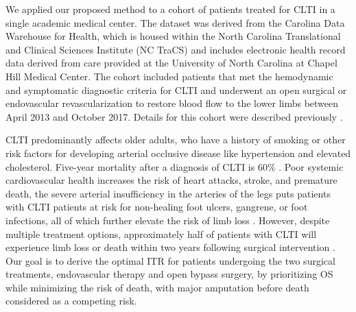 We applied our proposed method to a cohort of patients treated for CLTI in a single academic medical center. The dataset was derived  from the Carolina Data Warehouse for Health, which is housed within the North Carolina Translational and Clinical Sciences Institute (NC TraCS) and includes electronic health record data derived from care provided at the University of North Carolina at Chapel Hill Medical Center. The cohort included patients that met the hemodynamic and symptomatic diagnostic criteria for CLTI and underwent an open surgical or endovascular revascularization to restore blood flow to the lower limbs between April 2013 and October 2017. Details for this cohort were described previously \citep{mcginigle_precision_2021}.

CLTI predominantly affects older adults, who have a history of smoking or other risk factors for developing arterial occlusive disease like hypertension and elevated cholesterol. Five-year mortality after a diagnosis of CLTI is 60\% \citep{criqui1992mortality,van2018cardiovascular,baubeta2017amputation}. Poor systemic cardiovascular health increases the risk of heart attacks, stroke, and premature death, the severe arterial insufficiency in the arteries of the legs puts patients with CLTI patients at risk for non-healing foot ulcers, gangrene, or foot infections, all of which further elevate the risk of limb loss \citep{mills_society_2014, browder_analysis_2022, crowner_society_2022}. However, despite multiple treatment options, approximately half of patients with CLTI will experience limb loss or death within two years following surgical intervention \citep{farber_surgery_2022}. Our goal is to derive the optimal ITR for patients undergoing the two surgical treatments, endovascular therapy and open bypass surgery, by prioritizing OS while minimizing the risk of death, with major amputation before death considered as a competing risk.

